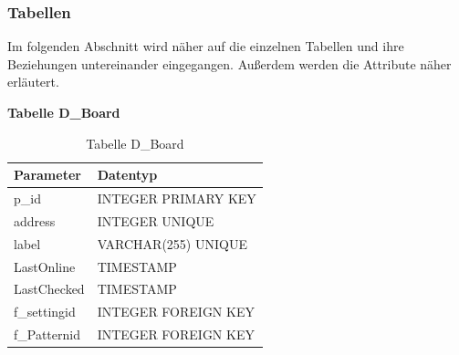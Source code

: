 \subsubsection{Tabellen}
Im folgenden Abschnitt wird näher auf die einzelnen Tabellen und ihre Beziehungen untereinander eingegangen. Außerdem werden die Attribute näher erläutert.

\newpage
\textbf{Tabelle D\_Board}\\

\begin{table}[H]
\begin{center}
\begin{tabular}{|l|l|}\hline
Parameter & Datentyp \\ \hline
p\_id & INTEGER PRIMARY KEY\\ 
address & INTEGER UNIQUE\\ 
label & VARCHAR(255) UNIQUE\\ 
LastOnline & TIMESTAMP\\ 
LastChecked & TIMESTAMP\\ 
f\_settingid & INTEGER FOREIGN KEY\\
f\_Patternid & INTEGER FOREIGN KEY\\ \hline
\end{tabular}
\caption{Tabelle D\_Board}
\label{table_TabelleD_Board}
\end{center}
\end{table}


